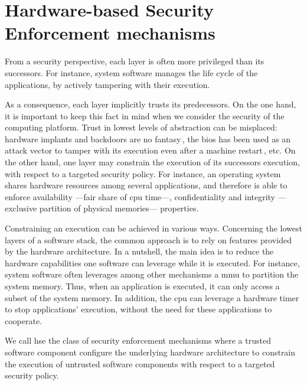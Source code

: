 
\section{Hardware-based Security Enforcement mechanisms}

From a security perspective, each layer is often more privileged than its
successors.
%
For instance, system software manages the life cycle of the applications, by
actively tampering with their execution.

As a consequence, each layer implicitly trusts its predecessors.
%
On the one hand, it is important to keep this fact in mind when we consider the
security of the computing platform.
%
Trust in lowest levels of abstraction can be misplaced: hardware implants and
backdoors are no fantasy\,\cite{yang2016a2}, the \ac{bios} has been used as an
attack vector to tamper with its execution even after a machine
restart\,\cite{embleton2013smm}, etc.
%
On the other hand, one layer may constrain the execution of its successors
execution, with respect to a targeted security policy.
%
For instance, an operating system shares hardware resources among several
applications, and therefore is able to enforce availability ---fair share of
\ac{cpu} time---, confidentiality and integrity ---exclusive partition of
physical memories--- properties.

Constraining an execution can be achieved in various ways.
%
Concerning the lowest layers of a software stack, the common approach is to rely
on features provided by the hardware architecture.
%
In a nutshell, the main idea is to reduce the hardware capabilities one software
can leverage while it is executed.
%
For instance, system software often leverages among other mechanisms a \ac{mmu}
to partition the system memory.
%
Thus, when an application is executed, it can only access a subset of the system
memory.
%
In addition, the \ac{cpu} can leverage a hardware timer to stop applications'
execution, without the need for these applications to cooperate.

\begin{definition}
  We call \ac{hse} the class of security enforcement mechanisms where a trusted
  software component configure the underlying hardware architecture to constrain
  the execution of untrusted software components with respect to a targeted
  security policy.
\end{definition}

